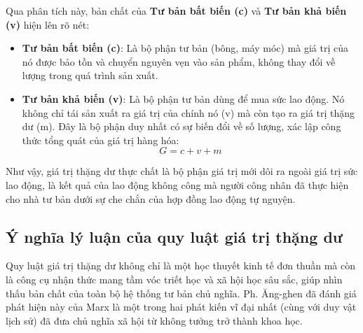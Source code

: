 Qua phân tích này, bản chất của \textbf{Tư bản bất biến (c)} và \textbf{Tư bản khả biến (v)} hiện lên rõ nét:
\begin{itemize}
    \item \textbf{Tư bản bất biến (c)}: Là bộ phận tư bản (bông, máy móc) mà giá trị của nó được bảo tồn và chuyển nguyên vẹn vào sản phẩm, không thay đổi về lượng trong quá trình sản xuất.
    \item \textbf{Tư bản khả biến (v)}: Là bộ phận tư bản dùng để mua sức lao động. Nó không chỉ tái sản xuất ra giá trị của chính nó (v) mà còn tạo ra giá trị thặng dư (m). Đây là bộ phận duy nhất có sự biến đổi về số lượng, xác lập công thức tổng quát của giá trị hàng hóa:
    \[
        G = c + v + m 
    \]
\end{itemize}
Như vậy, giá trị thặng dư thực chất là bộ phận giá trị mới dôi ra ngoài giá trị sức lao động, là kết quả của lao động không công mà người công nhân đã thực hiện cho nhà tư bản dưới sự che chắn của hợp đồng lao động tự nguyện.

\subsection{Ý nghĩa lý luận của quy luật giá trị thặng dư}
Quy luật giá trị thặng dư không chỉ là một học thuyết kinh tế đơn thuần mà còn là công cụ nhận thức mang tầm vóc triết học và xã hội học sâu sắc, giúp nhìn thấu bản chất của toàn bộ hệ thống tư bản chủ nghĩa. Ph. Ăng-ghen đã đánh giá phát hiện này của Marx là một trong hai phát kiến vĩ đại nhất (cùng với duy vật lịch sử) đã đưa chủ nghĩa xã hội từ không tưởng trở thành khoa học.

